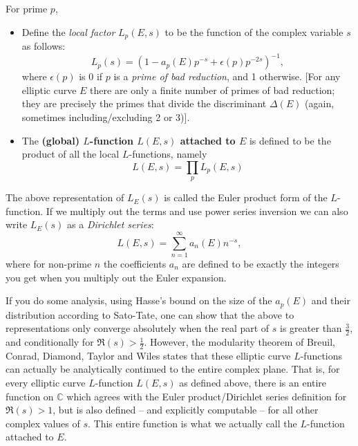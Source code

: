 \documentclass[10pt]{article}
\begin{document}
\begin{definition}  For prime $p$,
\begin{itemize}
\item Define the {\it local factor} $L_p(E,s)$ to be the function of the complex variable $s$ as follows:
\begin{equation}
L_p(s) = \left(1-a_p(E)p^{-s} + \epsilon(p)p^{-2s}\right)^{-1},
\end{equation}
where $\epsilon(p)$ is 0 if $p$ is a {\it prime of bad reduction}, and 1 otherwise. [For any elliptic curve $E$ there are only a finite number of primes of bad reduction; they are precisely the primes that divide the discriminant $\Delta(E)$ (again, sometimes including/excluding 2 or 3)].
\item The {\bf (global) $L$-function $L(E,s)$ attached to $E$} is defined to be the product of all the local $L$-functions, namely
\begin{equation}
L(E,s)  = \prod_{p} L_p(E,s)
\end{equation}
\end{itemize}
\end{definition}
The above representation of $L_E(s)$ is called the Euler product form of the $L$-function. If we multiply out the terms and use power series inversion we can also write $L_E(s)$ as a {\it Dirichlet series}:
\begin{equation}
L(E,s) = \sum_{n=1}^{\infty} a_n(E) n^{-s},
\end{equation}
where for non-prime $n$ the coefficients $a_n$ are defined to be exactly the integers you get when you multiply out the Euler expansion.

If you do some analysis, using Hasse's bound on the size of the $a_p(E)$ and their distribution according to Sato-Tate, one can show that the above to representations only converge absolutely when the real part of $s$ is greater than $\frac{3}{2}$, and conditionally for $\Re(s)>\frac{1}{2}$. However, the modularity theorem of Breuil, Conrad, Diamond, Taylor and Wiles \cite{BCDT-2011} \cite{TaWi-1995} \cite{Wil-1995} states that these elliptic curve $L$-functions can actually be analytically continued to the entire complex plane. That is, for every elliptic curve $L$-function $L(E,s)$ as defined above, there is an entire function on $\mathbb{C}$ which agrees with the Euler product/Dirichlet series definition for $\Re(s)>1$, but is also defined -- and explicitly computable -- for all other complex values of $s$. This entire function is what we actually call the $L$-function attached to $E$.
\end{document}
